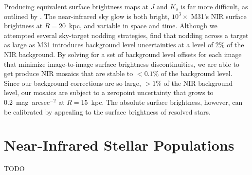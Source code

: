 \documentclass[11pt,twoside]{article}
\begin{document}
Producing equivalent surface brightness maps at $J$ and $K_s$ is far more difficult, as outlined by \cite{Sick:2013}.
The near-infrared sky glow is both bright, $10^3\times$ M31's NIR surface brightness at $R=20$~kpc, and variable in space and time.
Although we attempted several sky-target nodding strategies, \cite{Sick:2013} find that nodding across a target as large as M31 introduces background level uncertainties at a level of 2\% of the NIR background.
By solving for a set of background level offsets for each image that minimize image-to-image surface brightness discontinuities, we are able to get produce NIR mosaics that are stable to $< 0.1$\% of the background level.
Since our background corrections are so large, $>1$\% of the NIR background level, our mosaics are subject to a zeropoint uncertainty that grows to 0.2~mag~arcsec$^{-2}$ at $R=15$~kpc.
The absolute surface brightness, however, can be calibrated by appealing to the surface brightness of resolved stars.

\section{Near-Infrared Stellar Populations}

\acknowledgements TODO


\end{document}
